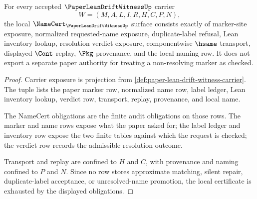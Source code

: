 \begin{theorem}
\label{thm:paper-lean-drift-witness-namecert-obligations}
For every accepted $\PaperLeanDriftWitnessUp$ carrier
$$
W=(M,A,L,I,R,H,C,P,N),
$$
the local $\NameCert_{\PaperLeanDriftWitnessUp}$ surface consists exactly of marker-site exposure, normalized requested-name exposure, duplicate-label refusal, Lean inventory lookup, resolution verdict exposure, componentwise $\hsame$ transport, displayed $\Cont$ replay, $\Pkg$ provenance, and the local naming row. It does not export a separate paper authority for treating a non-resolving marker as checked.
\end{theorem}
\begin{proof}
Carrier exposure is projection from \autoref{def:paper-lean-drift-witness-carrier}. The tuple lists the paper marker row, normalized name row, label ledger, Lean inventory lookup, verdict row, transport, replay, provenance, and local name.

The NameCert obligations are the finite audit obligations on those rows. The marker and name rows expose what the paper asked for; the label ledger and inventory row expose the two finite tables against which the request is checked; the verdict row records the admissible resolution outcome.

Transport and replay are confined to $H$ and $C$, with provenance and naming confined to $P$ and $N$. Since no row stores approximate matching, silent repair, duplicate-label acceptance, or unresolved-name promotion, the local certificate is exhausted by the displayed obligations.
\end{proof}

